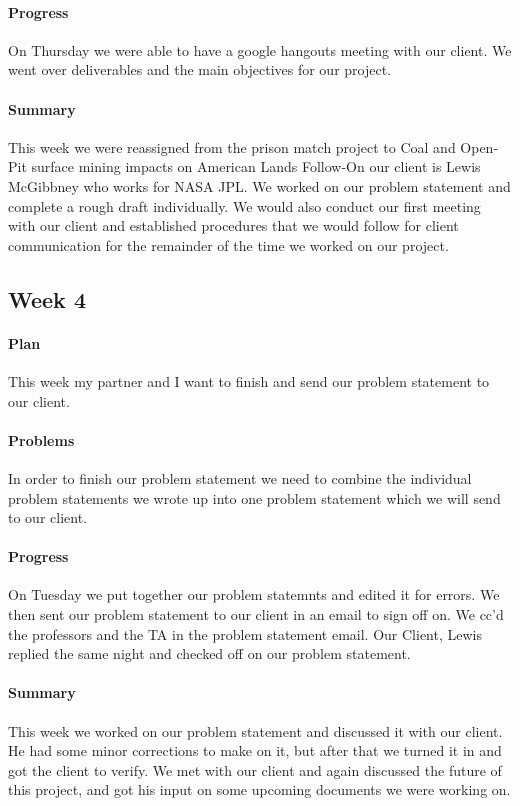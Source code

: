 \documentclass[onecolumn, draftclsnofoot,10pt, compsoc]{IEEEtran}
\begin{document}
\paragraph{Progress}
On Thursday we were able to have a google hangouts meeting with our client. We went over deliverables and the main objectives for our project.
\paragraph{Summary}
This week we were reassigned from the prison match project to  Coal and Open-Pit surface mining impacts on American Lands Follow-On our client is Lewis McGibbney who works for NASA JPL. We worked on our problem statement and complete a rough draft individually. We would also conduct our first meeting with our client and established procedures that we would follow for client communication for the remainder of the time we worked on our project.

\subsection{Week 4}
\paragraph{Plan}
This week my partner and I want to finish and send our problem statement to our client.
\paragraph{Problems}
In order to finish our problem statement we need to combine the individual problem statements we wrote up into one problem statement which we will send to our client.
\paragraph{Progress}
On Tuesday we put together our problem statemnts and edited it for errors. We then sent our problem statement to our client in an email to sign off on. We cc'd the professors and the TA in the problem statement email. Our Client, Lewis replied the same night and checked off on our problem statement.
\paragraph{Summary}
This week we worked on our problem statement and discussed it with our client. He had some minor corrections to make on it, but after that we turned it in and got the client to verify. We met with our client and again discussed the future of this project, and got his input on some upcoming documents we were working on.
\end{document}
